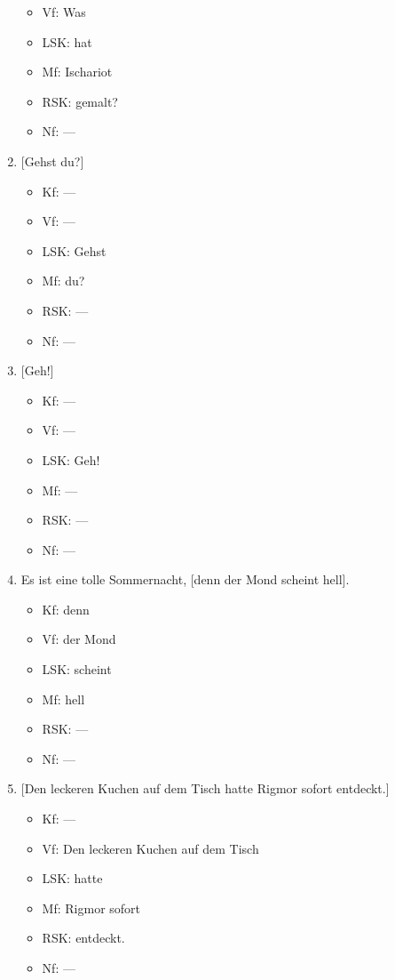 \begin{enumerate}
\begin{itemize}
      \item Vf: Was
      \item LSK: hat
      \item Mf: Ischariot
      \item RSK: gemalt?
      \item Nf: ---
    \end{itemize}
  \item{} [Gehst du?]
    \begin{itemize}\Lf
      \item Kf: ---
      \item Vf: ---
      \item LSK: Gehst
      \item Mf: du?
      \item RSK: ---
      \item Nf: ---
    \end{itemize}
  \item{} [Geh!]
    \begin{itemize}\Lf
      \item Kf: ---
      \item Vf: ---
      \item LSK: Geh!
      \item Mf: ---
      \item RSK: ---
      \item Nf: ---
    \end{itemize}
  \item Es ist eine tolle Sommernacht, [denn der Mond scheint hell].
    \begin{itemize}\Lf
      \item Kf: denn
      \item Vf: der Mond
      \item LSK: scheint
      \item Mf: hell
      \item RSK: ---
      \item Nf: ---
    \end{itemize}
  \item{} [Den leckeren Kuchen auf dem Tisch hatte Rigmor sofort entdeckt.]
    \begin{itemize}\Lf
      \item Kf: ---
      \item Vf: Den leckeren Kuchen auf dem Tisch
      \item LSK: hatte
      \item Mf: Rigmor sofort
      \item RSK: entdeckt.
      \item Nf: ---

\end{itemize}
\end{enumerate}

